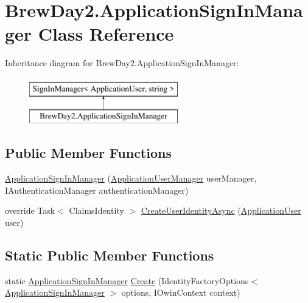 \hypertarget{class_brew_day2_1_1_application_sign_in_manager}{}\section{Brew\+Day2.\+Application\+Sign\+In\+Manager Class Reference}
\label{class_brew_day2_1_1_application_sign_in_manager}
Inheritance diagram for Brew\+Day2.\+Application\+Sign\+In\+Manager\+:\begin{figure}[H]
\begin{center}
\leavevmode
\includegraphics[height=2.000000cm]{class_brew_day2_1_1_application_sign_in_manager}
\end{center}
\end{figure}
\subsection*{Public Member Functions}
\begin{DoxyCompactItemize}
\item 
\mbox{\hyperlink{class_brew_day2_1_1_application_sign_in_manager_af4fd337302d32231496da6c6a24d800f}{Application\+Sign\+In\+Manager}} (\mbox{\hyperlink{class_brew_day2_1_1_application_user_manager}{Application\+User\+Manager}} user\+Manager, I\+Authentication\+Manager authentication\+Manager)
\item 
override Task$<$ Claims\+Identity $>$ \mbox{\hyperlink{class_brew_day2_1_1_application_sign_in_manager_ab672d1f9fc4c7a2ac8ccf6c34993b7a2}{Create\+User\+Identity\+Async}} (\mbox{\hyperlink{class_brew_day2_1_1_models_1_1_application_user}{Application\+User}} user)
\end{DoxyCompactItemize}
\subsection*{Static Public Member Functions}
\begin{DoxyCompactItemize}
\item 
static \mbox{\hyperlink{class_brew_day2_1_1_application_sign_in_manager}{Application\+Sign\+In\+Manager}} \mbox{\hyperlink{class_brew_day2_1_1_application_sign_in_manager_a14bb63619e0120bdb95a5eb45076b264}{Create}} (Identity\+Factory\+Options$<$ \mbox{\hyperlink{class_brew_day2_1_1_application_sign_in_manager}{Application\+Sign\+In\+Manager}} $>$ options, I\+Owin\+Context context)
\end{DoxyCompactItemize}


